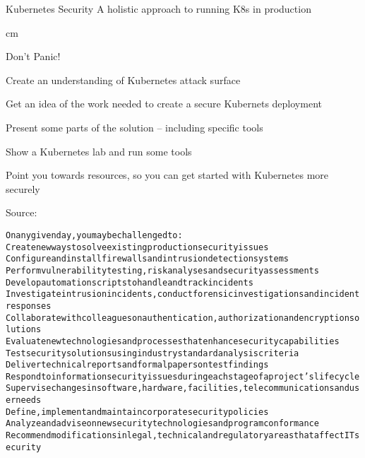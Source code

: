\documentclass[Screen16to9,17pt]{foils}
\begin{document}
{}

\mytitlepage
{Kubernetes Security}
{A holistic approach to running K8s in production}
\LogoOn



 cm

\centerline{\color{titlecolor}\LARGE Don't Panic!}


\begin{list1}
\item Create an understanding of Kubernetes attack surface
\item Get an idea of the work needed to create a secure Kubernets deployment
\item Present some parts of the solution -- including specific tools \faWrench
\item Show a Kubernetes lab and run some tools
\item Point you towards resources, so you can get started with Kubernetes more securely
\end{list1}



Source: 


\begin{alltt}\small
On any given day, you may be challenged to:
        Create new ways to solve existing production security issues
        Configure and install firewalls and intrusion detection systems
        Perform vulnerability testing, risk analyses and security assessments
        Develop automation scripts to handle and track incidents
        Investigate intrusion incidents, conduct forensic investigations and incident responses
        Collaborate with colleagues on authentication, authorization and encryption solutions
        Evaluate new technologies and processes that enhance security capabilities
        Test security solutions using industry standard analysis criteria
        Deliver technical reports and formal papers on test findings
        Respond to information security issues during each stage of a project’s lifecycle
        Supervise changes in software, hardware, facilities, telecommunications and user needs
        Define, implement and maintain corporate security policies
        Analyze and advise on new security technologies and program conformance
        Recommend modifications in legal, technical and regulatory areas that affect IT security
\end{alltt}
\end{document}
